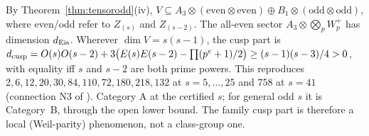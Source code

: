 \begin{remark}
By Theorem~\ref{thm:tensorodd}(iv), $V\subseteq A_3\otimes(\text{even}\otimes\text{even})\oplus B_1\otimes(\text{odd}\otimes\text{odd})$, where even/odd refer to $Z_{(s)}$ and $Z_{(s-2)}$.
The all-even sector $A_3\otimes\bigotimes_pW_p^+$ has dimension $d_{\rm Eis}$. Wherever $\dim V=s(s-1)$, the cusp part is
$d_{\rm cusp}=O(s)O(s-2)+3\bigl(E(s)E(s-2)-\prod(p^e+1)/2\bigr)\ge(s-1)(s-3)/4>0$, with equality iff $s$ and $s-2$ are both prime powers. This reproduces
$2,6,12,20,30,84,110,72,180,218,132$ at $s=5,\dots,25$ and $758$ at $s=41$ (connection N3 of ). Category A at the certified $s$; for general odd $s$
it is Category~B, through the open lower bound. The family cusp part is therefore a local (Weil-parity) phenomenon, not a class-group one.
\end{remark}

